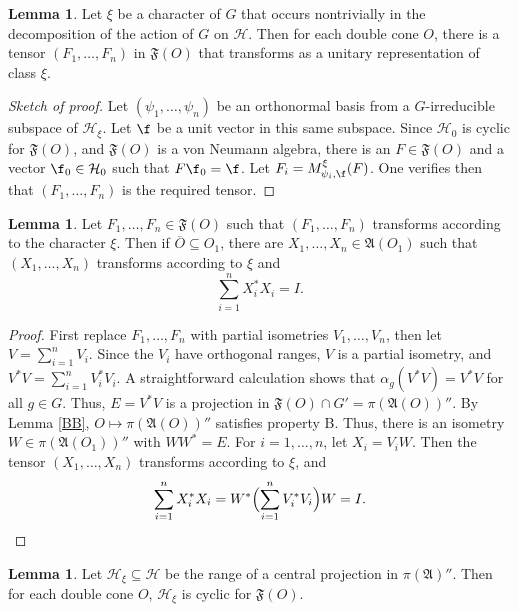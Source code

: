 \documentclass[12pt]{article}
\theoremstyle{definition}
\newtheorem{lemma}[thm]{Lemma}
\theoremstyle{definition}
\theoremstyle{remark}
\def\2#1{{\mathcal #1}}
\def\ol#1{{\overline #1}}
\def\al#1{{\mathfrak #1}}
\def\a{\alpha} \def\b{\beta} \def\g{\gamma} \def\d{\delta}
\begin{document}
\begin{lemma} Let $\xi$ be a character of $G$ that occurs
  nontrivially in the decomposition of the action of $G$ on $\2H$.
  Then for each double cone $O$, there is a tensor $(F_1,\dots ,F_n)$
  in $\al F(O)$ that transforms as a unitary representation of class
  $\xi$.
  \label{fullm}
\end{lemma}

\begin{proof}[Sketch of proof] Let $(\psi _1,\dots ,\psi _n)$ be an
  orthonormal basis from a $G$-irreducible subspace of $\2H _\xi$.
  Let $\f$ be a unit vector in this same subspace.  Since $\2H _0$ is
  cyclic for $\al F(O)$, and $\al F(O)$ is a von Neumann algebra,
  there is an $F\in \al F(O)$ and a vector $\f _0\in \2H _0$ such that
  $F\f _0=\f$.  Let $F_i=M^{\xi}_{\psi _i, \f } (F)$.  One verifies
  then that $(F_1,\dots ,F_n)$ is the required tensor.
\end{proof}


\begin{lemma} Let $F_1,\dots ,F_n\in \al F(O)$ such that $(F_1,\dots
  ,F_n)$ transforms according to the character $\xi$.  Then if $\ol
  O\subseteq O_1$, there are $X_1,\dots ,X_n\in \al A(O_1)$ such that
$(X_1,\dots ,X_n)$ transforms according to $\xi$ and
$$ \sum _{i=1}^{n}X_i^*X_i=I .$$  \label{support}
\end{lemma}

\begin{proof} First replace $F_1,\dots ,F_n$ with partial isometries
  $V_1,\dots ,V_n$, then let $V=\sum _{i=1}^{n}V_i$.  Since the $V_i$
  have orthogonal ranges, $V$ is a partial isometry, and $V^*V=\sum
  _{i=1}^{n}V_i^*V_i$.  A straightforward calculation shows that $\a
  _g(V^*V)=V^*V$ for all $g\in G$.  Thus, $E=V^*V$ is a projection in
  $\al F(O)\cap G'=\pi (\al A(O))''$.  By Lemma \ref{BB}, $O\mapsto
  \pi (\al A(O))''$ satisfies property B.  Thus, there is an isometry
  $W\in \pi (\al A (O_1))''$ with $WW^*=E$.  For $i=1,\dots ,n$, let
  $X_i=V_iW$.  Then the tensor $(X_1,\dots ,X_n)$ transforms according
  to $\xi$, and
$$\sum _{i=1}^{n}X_i^*X_i=W^*\Bigl( \sum _{i=1}^{n}V_i^*V_i \Bigr) W =I .$$
\end{proof}

\begin{lemma} Let $\2H _\xi\subseteq \2H$ be the range of a central
  projection in $\pi (\al A)''$.  Then for each double cone $O$, $\2H
  _\xi$ is cyclic for $\al F(O)$.  \label{sectors} \end{lemma}
\end{document}
